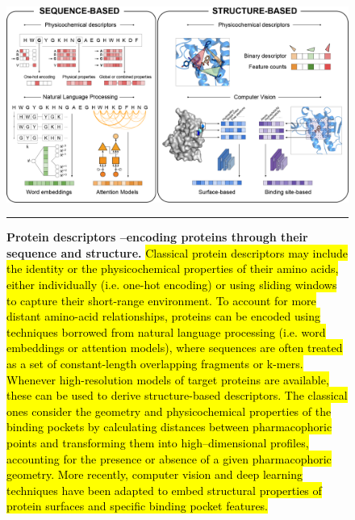 \begin{figure}[t!]
  \centering
  \includegraphics[width=\linewidth]{figures/Introduction/figure2_COCB.png}
  \caption{
    \textbf{Protein descriptors --encoding proteins through their sequence and structure.} 
     \hl{Classical protein descriptors may include the identity or the physicochemical properties of their amino acids, either individually (i.e. one-hot encoding) or using sliding windows to capture their short-range environment. To account for more distant amino-acid relationships, proteins can be encoded using techniques borrowed from natural language processing (i.e. word embeddings or attention models), where sequences are often treated as a set of constant-length overlapping fragments or k-mers. Whenever high-resolution models of target proteins are available, these can be used to derive structure-based descriptors. The classical ones consider the geometry and physicochemical properties of the binding pockets by calculating distances between pharmacophoric points and transforming them into high–dimensional profiles, accounting for the presence or absence of a given pharmacophoric geometry. More recently, computer vision and deep learning techniques have been adapted to embed structural properties of protein surfaces and specific binding pocket features.} 
  }
  \rule[0ex]{\textwidth}{0.5pt}
  \vspace{-5mm}
  \label{Introduction_Fig3}
\end{figure}


